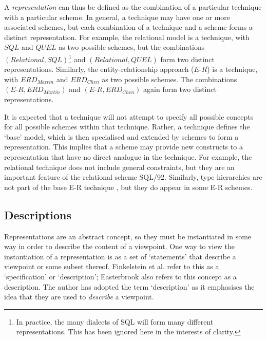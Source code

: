 \documentclass[10pt]{llncs}
\newcommand{\ER}{\mathit{E\textrm{-}R}}
\newcommand{\Martin}{\mathit{ERD_{Martin}}}
\newcommand{\Chen}{\mathit{ERD_{Chen}}}
\newcommand{\RM}{\mathit{Relational}}
\newcounter{tnote}
\begin{document}
A \emph{representation} can thus be defined as the combination of a particular technique with a particular scheme. In general, a technique may have one or more associated schemes, but each combination of a technique and a scheme forms a distinct representation. For example, the relational model is a technique, with $\mathit{SQL}$ and $\mathit{QUEL}$ as two possible schemes, but the combinations $(\RM,\mathit{SQL})$\footnote{In practice, the many dialects of SQL will form many different representations. This has been ignored here in the interests of clarity.} and $(\RM,\mathit{QUEL})$ form two distinct representations. Similarly, the entity-relationship approach ($\ER$) is a technique, with $\Martin$ and $\Chen$ as two possible schemes. The combinations $(\ER,\Martin)$ and $(\ER,\Chen)$ again form two distinct representations.

It is expected that a technique will not attempt to specify all possible concepts for all possible schemes within that technique. Rather, a technique defines the `base' model, which is then specialised and extended by schemes to form a representation. This implies that a scheme may provide new constructs to a representation that have no direct analogue in the technique. For example, the relational technique \cite{Codd:EF:1970} does not include general constraints, but they are an important feature of the relational scheme SQL/92. Similarly, type hierarchies are not part of the base E-R technique \cite{Chen:PP:1976}, but they do appear in some E-R schemes.


\subsection{Descriptions}
\label{Sec:MultipleRepresentations:Representations:Descriptions}

Representations are an abstract concept, so they must be instantiated in some way in order to describe the content of a viewpoint. One way to view the instantiation of a representation is as a set of `statements' that describe a viewpoint or some subset thereof. Finkelstein et al. \cite{Fink:ACW:1989} refer to this as a `specification' or `description'; Easterbrook \cite{East:SM:1991:PhD} also refers to this concept as a description. The author has adopted the term `description' as it emphasises the idea that they are used to \emph{describe} a viewpoint.
\end{document}
